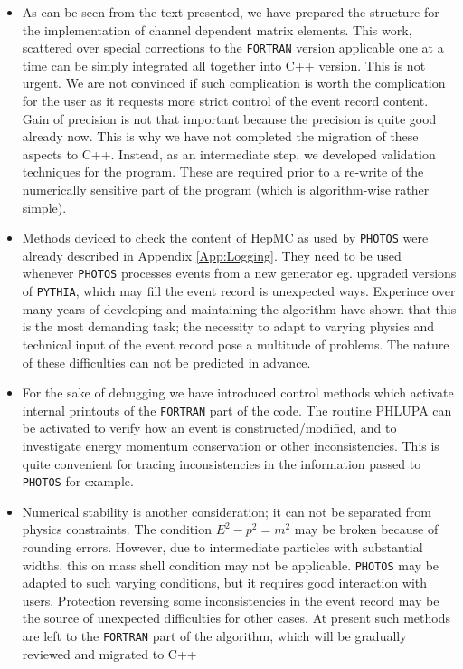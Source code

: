 \documentclass[]{Photos_interface_design}
\begin{document}
\begin{itemize}
\item
As can be seen from the text presented, we have prepared the structure 
for the implementation of channel dependent matrix elements. This work, scattered
 over special corrections to the {\tt FORTRAN} version applicable one at a time can  
be simply integrated all together into C++ version. This is not urgent.
 We are  not convinced if such complication is worth 
the complication for the user as it requests more strict control of the event 
record content. Gain of precision is 
not that important because the precision is quite good already now. 
This is why we have not completed the migration of these aspects to C++.
Instead, as an intermediate step, we developed validation techniques
for the program. These are required prior to a re-write of the
numerically sensitive part of the program (which is algorithm-wise
rather simple).

\item
Methods deviced to check the content of HepMC as used by {\tt PHOTOS} were already 
described in Appendix \ref{App:Logging}. 
They need to be used whenever {\tt PHOTOS} 
processes events from a new generator eg. upgraded versions of  {\tt PYTHIA},
which may fill the event record is unexpected ways.
Experince over many years of developing and maintaining the algorithm
have shown that this is the most demanding task; the necessity to
adapt to varying physics and technical input of the event record pose
a multitude of problems. The nature of these difficulties can not be
predicted in advance. 

\item
For the sake of debugging we have introduced control methods which activate
internal printouts of the {\tt FORTRAN} part of the code.
The routine PHLUPA \cite{Barberio:1993qi} can be activated  to verify 
how an event is constructed/modified, and to investigate energy 
momentum conservation or other inconsistencies.
This is quite convenient for tracing inconsistencies in the
information passed to {\tt PHOTOS} for example.


\item
Numerical stability is another consideration; it can not be separated from
physics constraints. The condition  $E^2-p^2=m^2$ may be broken  because of 
rounding errors.  However, due to intermediate particles with
  substantial widths, this on mass shell condition may not be applicable.
{\tt PHOTOS} may be adapted to such varying conditions, but it requires
good interaction with users. Protection reversing some 
inconsistencies in the event record may be the source of unexpected difficulties
for other cases. 
At present such methods are left to the {\tt FORTRAN} part of the algorithm, 
which
will be gradually reviewed and  migrated to C++
\end{itemize}
\end{document}
